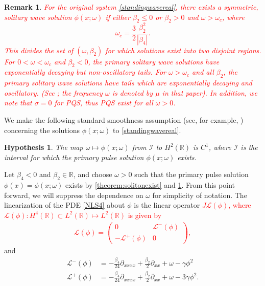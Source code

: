 \documentclass[12pt]{elsarticle}
\def\noi{\noindent}
\def\R{{\mathbb R}}
\def\calL{{\mathcal L}}
\def\calI{{\mathcal I}}
\newtheorem{hypothesis}{Hypothesis}
\newtheorem{remark}{Remark}
\newcommand{\revised}[1]{ \textcolor{red}{#1} }
\begin{document}
\begin{remark}\label{remark:soliton}
\revised{For the original system \cref{standingwavereal}, there exists a symmetric, solitary wave solution $\phi(x; \omega)$ if either $\beta_2 \leq 0$ or $\beta_2 > 0$ and $\omega > \omega_c$, where 
\begin{equation}\label{omegac}
\omega_c = \frac{3}{2} \frac{\beta_2^2}{|\beta_4|}.
\end{equation}
This divides the set of $(\omega, \beta_2)$ for which solutions exist into two disjoint regions. For $0 < \omega < \omega_c$ and $\beta_2 < 0$, the primary solitary wave solutions have exponentially decaying but non-oscillatory tails. For $\omega > \omega_c$ and all $\beta_2$, the primary solitary wave solutions have tails which are exponentially decaying and oscillatory. (See \cite[Figure 2(a)]{Tam2020}; the frequency $\omega$ is denoted by $\mu$ in that paper). In addition, we note that $\sigma = 0$ for PQS, thus PQS exist for all $\omega > 0$.} 
\end{remark}

\noi We make the following standard smoothness assumption (see, for example, \cite[Assumption 2]{Grillakis1987}) concerning the solutions $\phi(x; \omega)$ to \cref{standingwavereal}.

\begin{hypothesis}\label{hyp:smoothmap}
The map $\omega \mapsto \phi(x; \omega)$ from $\calI$ to $H^2(\R)$ is $C^1$, where $\calI$ is the interval for which the primary pulse solution $\phi(x; \omega)$ exists.
\end{hypothesis}

Let $\beta_4 < 0$ and $\beta_2 \in \R$, and choose $\omega > 0$ such that the primary pulse solution $\phi(x) = \phi(x; \omega)$ exists by \cref{theorem:solitonexist} and \cref{remark:soliton}. From this point forward, we will suppress the dependence on $\omega$ for simplicity of notation. The linearization of the PDE \cref{NLS4} about $\phi$ is the linear operator \revised{$J \calL(\phi)$, where $\calL(\phi): H^4(\R) \subset L^2(\R) \mapsto L^2(\R)$ is given by
\begin{align}\label{defLphi}
\calL(\phi) = 
\begin{pmatrix}
0 & \calL^-(\phi) \\
-\calL^+(\phi) & 0
\end{pmatrix},
\end{align}
}
and
\begin{align*}
\calL^-(\phi) &= -\frac{\beta_4}{24} \partial_{xxxx} + \frac{\beta_2}{2} \partial_{xx} + \omega - \gamma \phi^2 \\
\calL^+(\phi) &= -\frac{\beta_4}{24} \partial_{xxxx} + \frac{\beta_2}{2} \partial_{xx} + \omega - 3 \gamma \phi^2.
\end{align*}
\end{document}

